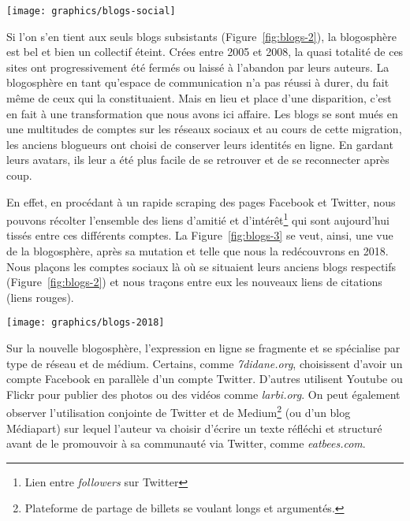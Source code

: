 \documentclass[symmetric,justified,marginals=raggedouter]{tufte-book}
\begin{document}
\newpage

\begin{figure*}
  \texttt{[image: graphics/blogs-social]}
  \caption{Liste des blogs de 2008 liés à des réseaux sociaux en 2018}
  \label{fig:blogs-social}
\end{figure*} 

\noindent Si l'on s'en tient aux seuls blogs subsistants (Figure~\ref{fig:blogs-2}), la blogosphère est bel et bien un collectif éteint. Crées entre 2005 et 2008, la quasi totalité de ces sites ont progressivement été fermés ou laissé à l'abandon par leurs auteurs. La blogosphère en tant qu'espace de communication n'a pas réussi à durer, du fait même de ceux qui la constituaient. Mais en lieu et place d'une disparition, c'est en fait à une transformation que nous avons ici affaire. Les blogs se sont mués en une multitudes de comptes sur les réseaux sociaux et au cours de cette migration, les anciens blogueurs ont choisi de conserver leurs identités en ligne. En gardant leurs avatars, ils leur a été plus facile de se retrouver et de se reconnecter après coup.

En effet, en procédant à un rapide scraping des pages Facebook et Twitter, nous pouvons récolter l'ensemble des liens d'amitié et d'intérêt\footnote{\RaggedOuter Lien entre \textit{followers} sur Twitter} qui sont aujourd'hui tissés entre ces différents comptes. La Figure~\ref{fig:blogs-3} se veut, ainsi, une vue de la blogosphère, après sa mutation et telle que nous la redécouvrons en 2018. Nous plaçons les comptes sociaux là où se situaient leurs anciens blogs respectifs (Figure~\ref{fig:blogs-2}) et nous traçons entre eux les nouveaux liens de citations (liens rouges).

\newpage

\begin{figure*}
  \texttt{[image: graphics/blogs-2018]}
  \caption{La blogosphère en 2018, les emplacements des blogs sont conservés}
  \label{fig:blogs-3}
\end{figure*} 

\noindent Sur la nouvelle blogosphère, l'expression en ligne se fragmente et se spécialise par type de réseau et de médium. Certains, comme \textit{7didane.org}, choisissent d'avoir un compte Facebook en parallèle d'un compte Twitter. D'autres utilisent Youtube ou Flickr pour publier des photos ou des vidéos comme \textit{larbi.org}. On peut également observer l'utilisation conjointe de Twitter et de Medium\footnote{\RaggedOuter Plateforme de partage de billets se voulant longs et argumentés.} (ou d'un blog Médiapart) sur lequel l'auteur va choisir d'écrire un texte réfléchi et structuré avant de le promouvoir à sa communauté via Twitter, comme \textit{eatbees.com}. 
\end{document}
